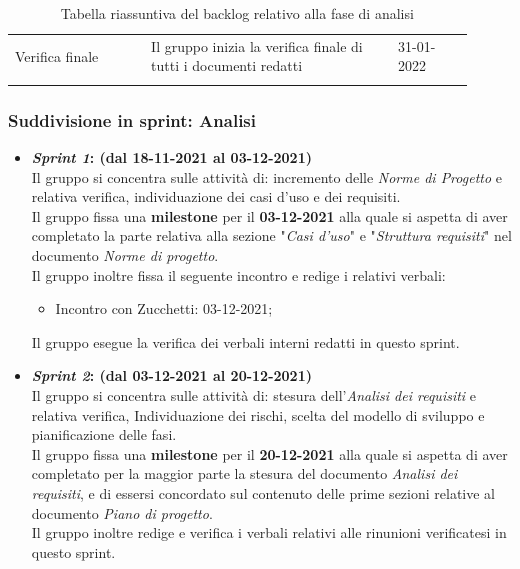 {\begin{longtable}{p{0.27\linewidth}p{0.49\linewidth}p{0.15\linewidth}}
    \rowcolor[RGB]{233, 245, 206}
    Verifica finale & Il gruppo inizia la verifica finale di tutti i documenti redatti & 31-01-2022\\

    \caption{Tabella riassuntiva del backlog relativo alla fase di analisi}
\end{longtable}	
}

\subsubsection{Suddivisione in sprint: Analisi}
\begin{itemize}
    \item \textbf{\textit{Sprint 1}: (dal 18-11-2021 al 03-12-2021)}\\
    Il gruppo si concentra sulle attività di: incremento delle \textit{Norme di Progetto} e relativa verifica, individuazione dei casi d'uso e dei requisiti.\\
    Il gruppo fissa una \textbf{milestone} per il \textbf{03-12-2021} alla quale si aspetta di aver completato la parte relativa alla sezione "\textit{Casi d'uso}" e "\textit{Struttura requisiti}" nel documento \textit{Norme di progetto}.\\
    Il gruppo inoltre fissa il seguente incontro e redige i relativi verbali:
    \begin{itemize}
        \item Incontro con Zucchetti: 03-12-2021;
    \end{itemize} 
    Il gruppo esegue la verifica dei verbali interni redatti in questo sprint.

    \item \textbf{\textit{Sprint 2}: (dal 03-12-2021 al 20-12-2021)}\\
    Il gruppo si concentra sulle attività di: stesura dell'\textit{Analisi dei requisiti} e relativa verifica, Individuazione dei rischi, scelta del modello di sviluppo e pianificazione delle fasi.\\
    Il gruppo fissa una \textbf{milestone} per il \textbf{20-12-2021} alla quale si aspetta di aver completato per la maggior parte la stesura del documento \textit{Analisi dei requisiti}, e di essersi concordato sul contenuto delle prime sezioni relative al documento \textit{Piano di progetto}.\\
    Il gruppo inoltre redige e verifica i verbali relativi alle rinunioni verificatesi in questo sprint.


\end{itemize}
